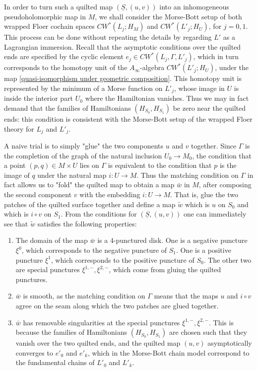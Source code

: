 \documentclass{amsart}
\numberwithin{equation}{section}
\numberwithin{figure}{section}
\begin{document}
	In order to turn such a quilted map $(\underline{S}, (u, v))$ into an inhomogeneous pseudoholomorphic map in $M$, we shall consider the Morse-Bott setup of both wrapped Floer cochain spaces $CW^{*}(L_{j}; H_{M})$ and $CW^{*}(L'_{j}; H_{U})$, for $j = 0, 1$. This process can be done without repeating the details by regarding $L'$ as a Lagrangian immersion. Recall that the asymptotic conditions over the quilted ends are specified by the cyclic element $e_{j} \in CW^{*}(L_{j}, \Gamma, L'_{j})$, which in turn corresponds to the homotopy unit of the $A_{\infty}$-algebra $CW^{*}(L'_{j}; H_{U})$, under the map \eqref{quasi-isomorphism under geometric composition}. This homotopy unit is represented by the minimum of a Morse function on $L'_{j}$, whose image in $U$ is inside the interior part $U_{0}$ where the Hamiltonian vanishes. Thus we may in fact demand that the families of Hamiltonians $(H_{S_{0}}, H_{S_{1}})$ be zero near the quilted ends: this condition is consistent with the Morse-Bott setup of the wrapped Floer theory for $L_{j}$ and $L'_{j}$. \par
	A naive trial is to simply "glue" the two components $u$ and $v$ together. Since $\Gamma$ is the completion of the graph of the natural inclusion $U_{0} \to M_{0}$, the condition that a point $(p, q) \in M \times U$ lies on $\Gamma$ is equivalent to the condition that $p$ is the image of $q$ under the natural map $i: U \to M$. Thus the matching condition on $\Gamma$ in fact allows us to "fold" the quilted map to obtain a map $\bar{w}$ in $M$, after composing the second component $v$ with the embedding $i: U \to M$. That is, glue the two patches of the quilted surface together and define a map $\tilde{w}$ which is $u$ on $S_{0}$ and which is $i \circ v$ on $S_{1}$. From the conditions for $(\underline{S}, (u, v))$ one can immediately see that $\tilde{w}$ satisfies the following properties: 
\begin{enumerate}[label=(\roman*)]

\item The domain of the map $\bar{w}$ is a $4$-punctured disk. One is a negative puncture $\xi^{0}$, which corresponds to the negative puncture of $S_{1}$. One is a positive puncture $\xi^{1}$, which corresponds to the positive puncture of $S_{0}$. The other two are special punctures $\xi^{1, -}, \xi^{2, -}$, which come from gluing the quilted punctures.

\item $\bar{w}$ is smooth, as the matching condition on $\Gamma$ means that the maps $u$ and $i \circ v$ agree on the seam along which the two patches are glued together.

\item $\bar{w}$ has removable singularities at the special punctures $\xi^{1, -}, \xi^{2, -}$. This is because the families of Hamiltonians $(H_{S_{0}}, H_{S_{1}})$ are chosen such that they vanish over the two quilted ends, and the quilted map $(u, v)$ asymptotically converges to $e'_{0}$ and $e'_{k}$, which in the Morse-Bott chain model correspond to the fundamental chains of $L'_{0}$ and $L'_{k}$.
 
\end{enumerate}\par
\end{document}
